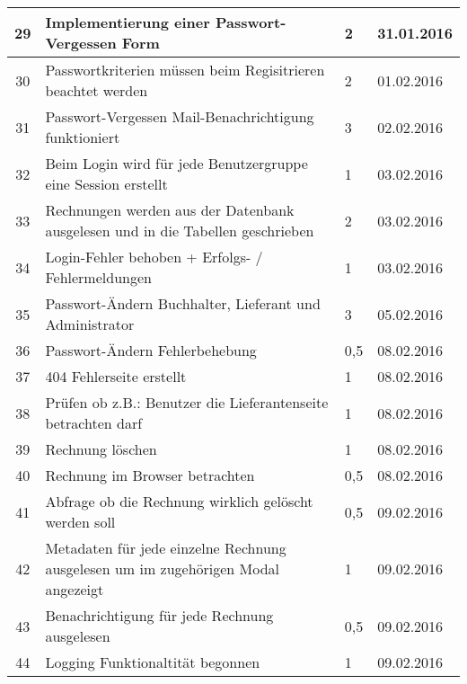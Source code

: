 \begin{longtable}[h]{| c | p{11.6cm} | l | l |}
29 & Implementierung einer Passwort-Vergessen Form & 2 & 31.01.2016 \\ \hline

30 & Passwortkriterien müssen beim Regisitrieren beachtet werden & 2 & 01.02.2016 \\ \hline

31 & Passwort-Vergessen Mail-Benachrichtigung funktioniert &  3 & 02.02.2016 \\ \hline

32 & Beim Login wird für jede Benutzergruppe eine Session erstellt & 1 & 03.02.2016 \\ \hline

33 & Rechnungen werden aus der Datenbank ausgelesen und in die Tabellen geschrieben & 2 & 03.02.2016 \\ \hline

34 & Login-Fehler behoben + Erfolgs- / Fehlermeldungen & 1 & 03.02.2016 \\ \hline

35 & Passwort-Ändern Buchhalter, Lieferant und Administrator & 3 & 05.02.2016 \\ \hline

36 & Passwort-Ändern Fehlerbehebung & 0,5 & 08.02.2016 \\ \hline

37 & 404 Fehlerseite erstellt & 1 & 08.02.2016 \\ \hline

38 & Prüfen ob z.B.: Benutzer die Lieferantenseite betrachten darf & 1 & 08.02.2016 \\ \hline

39 & Rechnung löschen & 1 & 08.02.2016 \\ \hline

40 & Rechnung im Browser betrachten & 0,5 & 08.02.2016 \\ \hline

41 & Abfrage ob die Rechnung wirklich gelöscht werden soll & 0,5  & 09.02.2016 \\ \hline

42 & Metadaten für jede einzelne Rechnung ausgelesen um im zugehörigen Modal angezeigt & 1 & 09.02.2016\\ \hline

43 & Benachrichtigung für jede Rechnung ausgelesen & 0,5 & 09.02.2016 \\ \hline

44 & Logging Funktionaltität begonnen & 1 & 09.02.2016 \\ \hline


\end{longtable}
